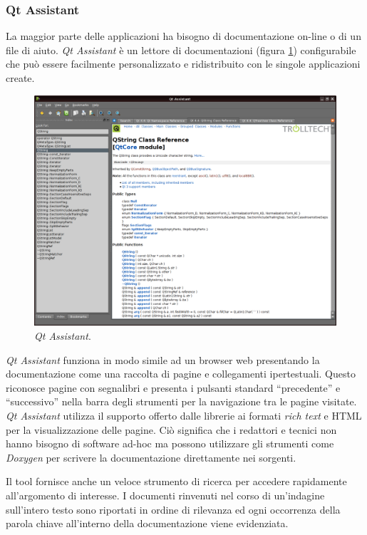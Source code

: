 \subsubsection{Qt Assistant}
La maggior parte delle applicazioni ha bisogno di documentazione on-line o di un file di aiuto. \emph{Qt Assistant} è un lettore di documentazioni (figura \ref{figura:qtassistant}) configurabile che può essere facilmente personalizzato e ridistribuito con le singole applicazioni create.

\begin{figure}[!htb]
	\centering
	\includegraphics[width=12cm]{images/qtassistant.png}
	\caption{\emph{Qt Assistant}.}
	\label{figura:qtassistant}
\end{figure}

\emph{Qt Assistant} funziona in modo simile ad un browser web presentando la documentazione come una raccolta di pagine e collegamenti ipertestuali. Questo riconosce pagine con segnalibri e presenta i pulsanti standard ``precedente'' e ``successivo'' nella barra degli strumenti per la navigazione tra le pagine visitate. \emph{Qt Assistant} utilizza il supporto offerto dalle librerie \qt{} ai formati \emph{rich text} e HTML per la visualizzazione delle pagine. Ciò significa che i redattori e tecnici non hanno bisogno di software ad-hoc ma possono utilizzare gli strumenti come \emph{Doxygen} per scrivere la documentazione direttamente nei sorgenti.

Il tool fornisce anche un veloce strumento di ricerca per accedere rapidamente all'argomento di interesse. I documenti rinvenuti nel corso di un'indagine sull'intero testo sono riportati in ordine di rilevanza ed ogni occorrenza della parola chiave all'interno della documentazione viene evidenziata.

